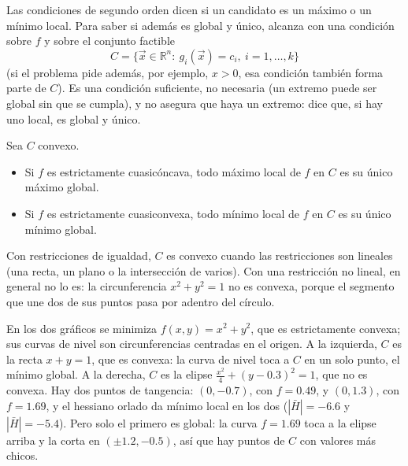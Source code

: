 \documentclass{article}
\newcommand{\R}{\ensuremath{\mathbb{R}}}
\newcommand{\vect}[1]{\vec{#1}}
\begin{document}
Las condiciones de segundo orden dicen si un candidato es un máximo o un mínimo local. Para saber si además es global y único, alcanza con una condición sobre \(f\) y sobre el conjunto factible
\[
C=\bigl\{\vect{x}\in\R^n:\ g_i(\vect{x})=c_i,\ i=1,\dots,k\bigr\}
\]
(si el problema pide además, por ejemplo, \(x>0\), esa condición también forma parte de \(C\)). Es una condición suficiente, no necesaria (un extremo puede ser global sin que se cumpla), y no asegura que haya un extremo: dice que, si hay uno local, es global y único.

 Sea \(C\) convexo.
\begin{itemize}
  \item Si \(f\) es estrictamente cuasicóncava, todo máximo local de \(f\) en \(C\) es su único máximo global.
  \item Si \(f\) es estrictamente cuasiconvexa, todo mínimo local de \(f\) en \(C\) es su único mínimo global.
\end{itemize}
Con restricciones de igualdad, \(C\) es convexo cuando las restricciones son lineales (una recta, un plano o la intersección de varios). Con una restricción no lineal, en general no lo es: la circunferencia \(x^2+y^2=1\) no es convexa, porque el segmento que une dos de sus puntos pasa por adentro del círculo.

En los dos gráficos se minimiza \(f(x,y)=x^2+y^2\), que es estrictamente convexa; sus curvas de nivel son circunferencias centradas en el origen. A la izquierda, \(C\) es la recta \(x+y=1\), que es convexa: la curva de nivel toca a \(C\) en un solo punto, el mínimo global. A la derecha, \(C\) es la elipse \(\tfrac{x^2}{4}+(y-0.3)^2=1\), que no es convexa. Hay dos puntos de tangencia: \((0,-0.7)\), con \(f=0.49\), y \((0,1.3)\), con \(f=1.69\), y el hessiano orlado da mínimo local en los dos (\(|\bar H|=-6.6\) y \(|\bar H|=-5.4\)). Pero solo el primero es global: la curva \(f=1.69\) toca a la elipse arriba y la corta en \((\pm1.2,-0.5)\), así que hay puntos de \(C\) con valores más chicos.
\end{document}

